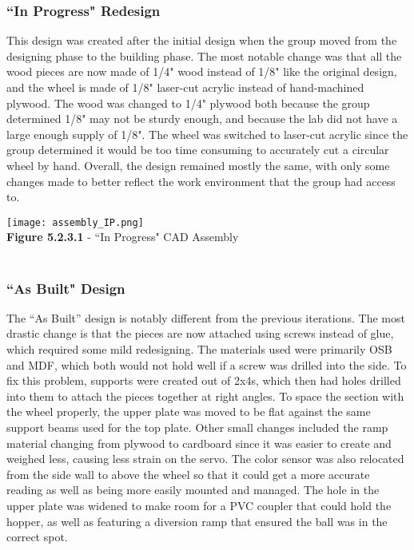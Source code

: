 \documentclass{article}
\begin{document}
\subsubsection{``In Progress" Redesign}

This design was created after the initial design when the group moved from the designing phase to the building phase. The most notable change was that all the wood pieces are now made of 1/4" wood instead of 1/8" like the original design, and the wheel is made of 1/8" laser-cut acrylic instead of hand-machined plywood. The wood was changed to 1/4" plywood both because the group determined 1/8" may not be sturdy enough, and because the lab did not have a large enough supply of 1/8". The wheel was switched to laser-cut acrylic since the group determined it would be too time consuming to accurately cut a circular wheel by hand. Overall, the design remained mostly the same, with only some changes made to better reflect the work environment that the group had access to.

\begin{center}
    \texttt{[image: assembly\_IP.png]}\\
    \small{\textbf{Figure 5.2.3.1} - ``In Progress" CAD Assembly}\\~\\
\end{center}

\subsubsection{``As Built" Design}

The ``As Built'' design is notably different from the previous iterations. The most drastic change is that the pieces are now attached using screws instead of glue, which required some mild redesigning. The materials used were primarily OSB and MDF, which both would not hold well if a screw was drilled into the side. To fix this problem, supports were created out of 2x4s, which then had holes drilled into them to attach the pieces together at right angles. To space the section with the wheel properly, the upper plate was moved to be flat against the same support beams used for the top plate. Other small changes included the ramp material changing from plywood to cardboard since it was easier to create and weighed less, causing less strain on the servo. The color sensor was also relocated from the side wall to above the wheel so that it could get a more accurate reading as well as being more easily mounted and managed. The hole in the upper plate was widened to make room for a PVC coupler that could hold the hopper, as well as featuring a diversion ramp that ensured the ball was in the correct spot.
\end{document}
